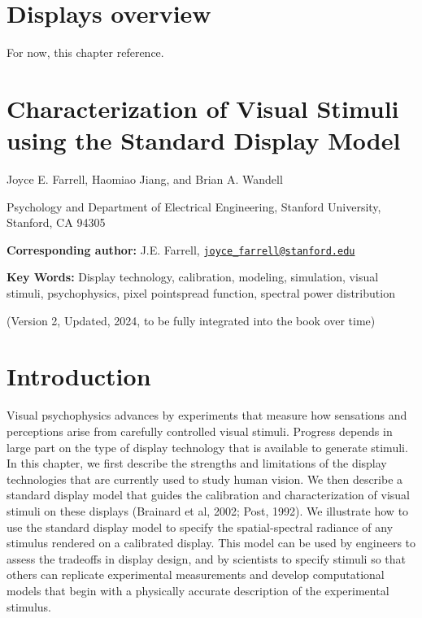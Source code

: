 \documentclass[
  letterpaper,
]{book}
\begin{document}
\section{Displays overview}\label{sec-displays-overview}

For now, this chapter reference.

\section{Characterization of Visual Stimuli using the Standard Display
Model}\label{characterization-of-visual-stimuli-using-the-standard-display-model}

Joyce E. Farrell, Haomiao Jiang, and Brian A. Wandell

Psychology and Department of Electrical Engineering, Stanford
University, Stanford, CA 94305

\textbf{Corresponding author:} J.E. Farrell,
\href{mailto:joyce_farrell@stanford.edu}{\nolinkurl{joyce\_farrell@stanford.edu}}

\textbf{Key Words:} Display technology, calibration, modeling,
simulation, visual stimuli, psychophysics, pixel pointspread function,
spectral power distribution

(Version 2, Updated, 2024, to be fully integrated into the book over
time)

\section{Introduction}\label{introduction}

Visual psychophysics advances by experiments that measure how sensations
and perceptions arise from carefully controlled visual stimuli. Progress
depends in large part on the type of display technology that is
available to generate stimuli. In this chapter, we first describe the
strengths and limitations of the display technologies that are currently
used to study human vision. We then describe a standard display model
that guides the calibration and characterization of visual stimuli on
these displays (Brainard et al, 2002; Post, 1992). We illustrate how to
use the standard display model to specify the spatial-spectral radiance
of any stimulus rendered on a calibrated display. This model can be used
by engineers to assess the tradeoffs in display design, and by
scientists to specify stimuli so that others can replicate experimental
measurements and develop computational models that begin with a
physically accurate description of the experimental stimulus.
\end{document}
